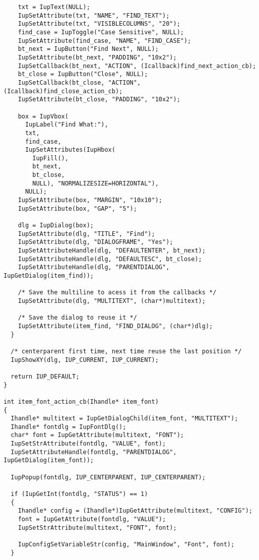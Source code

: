 \documentclass{ctexart}
\begin{document}
\begin{lstlisting}
    txt = IupText(NULL);
    IupSetAttribute(txt, "NAME", "FIND_TEXT");
    IupSetAttribute(txt, "VISIBLECOLUMNS", "20");
    find_case = IupToggle("Case Sensitive", NULL);
    IupSetAttribute(find_case, "NAME", "FIND_CASE");
    bt_next = IupButton("Find Next", NULL);
    IupSetAttribute(bt_next, "PADDING", "10x2");
    IupSetCallback(bt_next, "ACTION", (Icallback)find_next_action_cb);
    bt_close = IupButton("Close", NULL);
    IupSetCallback(bt_close, "ACTION", (Icallback)find_close_action_cb);
    IupSetAttribute(bt_close, "PADDING", "10x2");

    box = IupVbox(
      IupLabel("Find What:"),
      txt,
      find_case,
      IupSetAttributes(IupHbox(
        IupFill(),
        bt_next,
        bt_close,
        NULL), "NORMALIZESIZE=HORIZONTAL"),
      NULL);
    IupSetAttribute(box, "MARGIN", "10x10");
    IupSetAttribute(box, "GAP", "5");

    dlg = IupDialog(box);
    IupSetAttribute(dlg, "TITLE", "Find");
    IupSetAttribute(dlg, "DIALOGFRAME", "Yes");
    IupSetAttributeHandle(dlg, "DEFAULTENTER", bt_next);
    IupSetAttributeHandle(dlg, "DEFAULTESC", bt_close);
    IupSetAttributeHandle(dlg, "PARENTDIALOG", IupGetDialog(item_find));

    /* Save the multiline to acess it from the callbacks */
    IupSetAttribute(dlg, "MULTITEXT", (char*)multitext);

    /* Save the dialog to reuse it */
    IupSetAttribute(item_find, "FIND_DIALOG", (char*)dlg);
  }

  /* centerparent first time, next time reuse the last position */
  IupShowXY(dlg, IUP_CURRENT, IUP_CURRENT);

  return IUP_DEFAULT;
}

int item_font_action_cb(Ihandle* item_font)
{
  Ihandle* multitext = IupGetDialogChild(item_font, "MULTITEXT");
  Ihandle* fontdlg = IupFontDlg();
  char* font = IupGetAttribute(multitext, "FONT");
  IupSetStrAttribute(fontdlg, "VALUE", font);
  IupSetAttributeHandle(fontdlg, "PARENTDIALOG", IupGetDialog(item_font));

  IupPopup(fontdlg, IUP_CENTERPARENT, IUP_CENTERPARENT);

  if (IupGetInt(fontdlg, "STATUS") == 1)
  {
    Ihandle* config = (Ihandle*)IupGetAttribute(multitext, "CONFIG");
    font = IupGetAttribute(fontdlg, "VALUE");
    IupSetStrAttribute(multitext, "FONT", font);

    IupConfigSetVariableStr(config, "MainWindow", "Font", font);
  }


\end{lstlisting}
\end{document}
